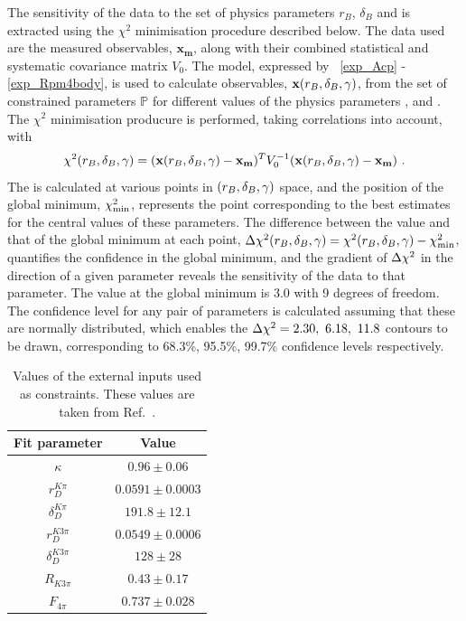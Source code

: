 The sensitivity of the data to the set of physics parameters $r_B$, $\delta_B$ and \Pgamma is extracted using the $\chi^2$ minimisation procedure described below. The data used are the measured \CP observables, $\mathbf{x_m}$, along with their combined statistical and systematic covariance matrix $V_0$. The model, expressed by \eqns~\ref{exp_Acp} - \ref{exp_Rpm4body}, is used to calculate \CP observables, $\mathbf{x}(r_B, \delta_B, \gamma)$, from the set of constrained parameters $\mathbb{P}$ for different values of the physics parameters \rb, \deltab and \Pgamma. The $\chi^2$ minimisation producure is performed, taking correlations into account, with
\begin{equation}
\chi^2(r_B, \delta_B, \gamma) = (\mathbf{x}(r_B, \delta_B, \gamma) - \mathbf{x_m})^TV_0^{-1}(\mathbf{x}(r_B, \delta_B, \gamma) - \mathbf{x_m}) \text{ .}
\end{equation}
The \chisq is calculated at various points in $\left(r_B, \delta_B, \gamma\right)$ space, and the position of the global minimum, $\chi^2_{\text{min}}$, represents the point corresponding to the best estimates for the central values of these parameters. The difference between the \chisq value and that of the global minimum at each point, $\Delta\chi^2(r_B, \delta_B, \gamma) = \chi^2(r_B, \delta_B, \gamma) - \chi^2_{\text{min}}$, quantifies the confidence in the global minimum, and the gradient of $\Delta\chi^2$ in the direction of a given parameter reveals the sensitivity of the data to that parameter. The \chisq value at the global minimum is 3.0 with 9 degrees of freedom. The confidence level for any pair of parameters is calculated assuming that these are normally distributed, which enables the $\Delta\chi^2 = 2.30,\ 6.18,\ 11.8$ contours to be drawn, corresponding to 68.3\%, 95.5\%, 99.7\% confidence levels respectively.

\begin{table}
\centering
\begin{tabular}{cc}
Fit parameter & Value \\
\hline
$\kappa$ & $0.96 \pm 0.06$ \\
$r_D^{K\pi}$ & $0.0591 \pm 0.0003$ \\
$\delta_D^{K\pi}$ & $191.8 \pm 12.1$ \\
$r_D^{K3\pi}$ & $0.0549 \pm 0.0006$ \\
$\delta_D^{K3\pi}$ & $128 \pm 28$ \\
$R_{K3\pi}$ & $0.43 \pm 0.17$ \\
$F_{4\pi}$ & $0.737 \pm 0.028$
\end{tabular}
\caption{Values of the external inputs used as constraints. These values are taken from Ref.~\cite{HFAG,charmk3pi,charmk3pi_errata,charm4pi}.}
\label{inputparameters}
\end{table}

